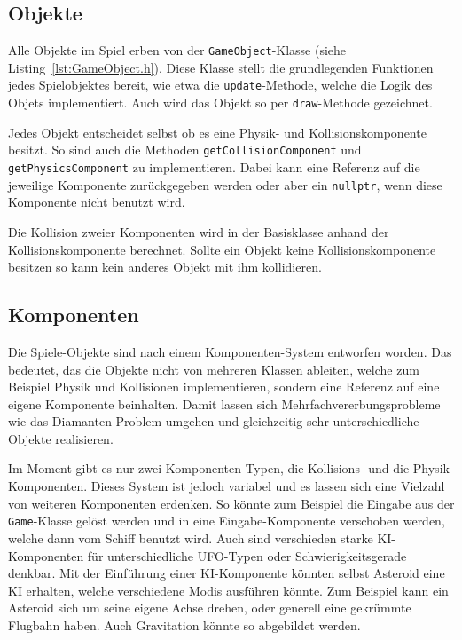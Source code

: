 \documentclass[12pt, a4paper, titlepage, hidelinks]{scrreprt}
\begin{document}
\subsection{Objekte}

Alle Objekte im Spiel erben von der \texttt{GameObject}-Klasse (siehe Listing~\autoref{lst:GameObject.h}). Diese Klasse stellt die grundlegenden Funktionen jedes Spielobjektes bereit, wie etwa die \texttt{update}-Methode, welche die Logik des Objets implementiert. Auch wird das Objekt so per \texttt{draw}-Methode gezeichnet.

Jedes Objekt entscheidet selbst ob es eine Physik- und Kollisionskomponente besitzt. So sind auch die Methoden \texttt{getCollisionComponent} und \texttt{getPhysicsComponent} zu implementieren. Dabei kann eine Referenz auf die jeweilige Komponente zurückgegeben werden oder aber ein \texttt{nullptr}, wenn diese Komponente nicht benutzt wird.

Die Kollision zweier Komponenten wird in der Basisklasse anhand der Kollisionskomponente berechnet. Sollte ein Objekt keine Kollisionskomponente besitzen so kann kein anderes Objekt mit ihm kollidieren.


\subsection{Komponenten}

Die Spiele-Objekte sind nach einem Komponenten-System entworfen worden. Das bedeutet, das die Objekte nicht von mehreren Klassen ableiten, welche zum Beispiel Physik und Kollisionen implementieren, sondern eine Referenz auf eine eigene Komponente beinhalten. Damit lassen sich Mehrfachvererbungsprobleme wie das Diamanten-Problem umgehen und gleichzeitig sehr unterschiedliche Objekte realisieren.

Im Moment gibt es nur zwei Komponenten-Typen, die Kollisions- und die Physik-Komponenten. Dieses System ist jedoch variabel und es lassen sich eine Vielzahl von weiteren Komponenten erdenken. So könnte zum Beispiel die Eingabe aus der \texttt{Game}-Klasse gelöst werden und in eine Eingabe-Komponente verschoben werden, welche dann vom Schiff benutzt wird. Auch sind verschieden starke KI-Komponenten für unterschiedliche UFO-Typen oder Schwierigkeitsgerade denkbar. Mit der Einführung einer KI-Komponente könnten selbst Asteroid eine KI erhalten, welche verschiedene Modis ausführen könnte. Zum Beispiel kann ein Asteroid sich um seine eigene Achse drehen, oder generell eine gekrümmte Flugbahn haben. Auch Gravitation könnte so abgebildet werden.
\end{document}
